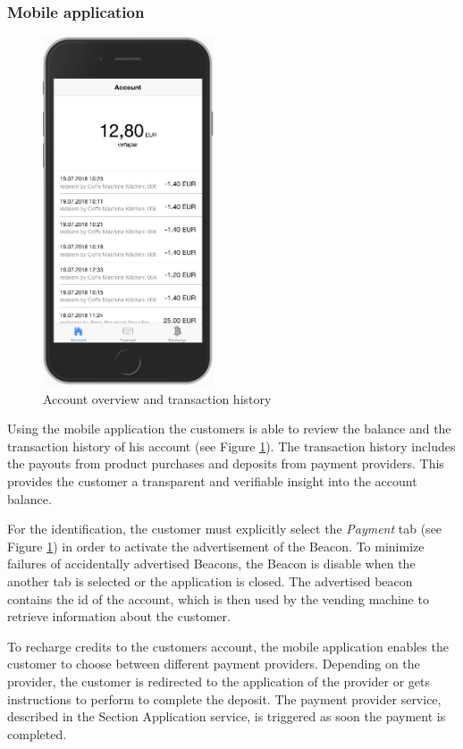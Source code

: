\subsubsection{Mobile application}
\begin{figure}[ht]
\centering
  \includegraphics[width=0.45\textwidth]{assets/mobileapp.jpeg}
\caption{Account overview and transaction history}
\label{fig:mobile}
\end{figure}
Using the mobile application the customers is able to review the balance and the transaction history of his account (see Figure \ref{fig:mobile}). The transaction history includes the payouts from product purchases and deposits from payment providers. This provides the customer a transparent and verifiable insight into the account balance. 

For the identification, the customer must explicitly select the \textit{Payment} tab (see Figure \ref{fig:mobile}) in order to activate the advertisement of the Beacon. To minimize failures of accidentally advertised Beacons, the Beacon is disable when the another tab is selected or the application is closed. The advertised beacon contains the id of the account, which is then used by the vending machine to retrieve information about the customer.

To recharge credits to the customers account, the mobile application enables the customer to choose between different payment providers. Depending on the provider, the customer is redirected to the application of the provider or gets instructions to perform to complete the deposit. The payment provider service, described in the Section Application service, is triggered as soon the payment is completed.

